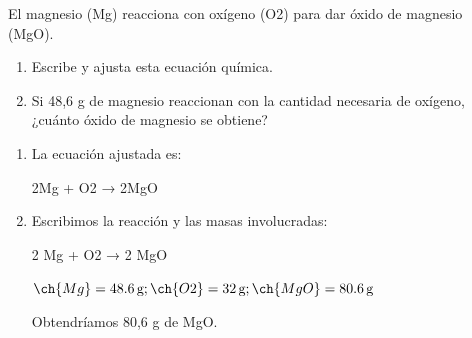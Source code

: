 \begin{exercise}
    El magnesio (Mg) reacciona con oxígeno (O2) para dar óxido de magnesio (MgO).
    \begin{enumerate}[label=\letraminuscula]
        \item Escribe y ajusta esta ecuación química.
        \item Si 48,6 g de magnesio reaccionan con la
        cantidad necesaria de oxígeno, ¿cuánto
        óxido de magnesio se obtiene?
    \end{enumerate}
    \begin{solu}
        \begin{enumerate}[label=\letraminuscula]
            \item La ecuación ajustada es:
            \begin{reaction*}
                2Mg + O2 → 2MgO
            \end{reaction*}
            \item Escribimos la reacción y las masas involucradas:
            \begin{reaction*}
                2 Mg + O2 → 2 MgO
            \end{reaction*}
            \( \ch{Mg} = \qty{48.6}{\g}; \ch{O2} = \qty{32}{\g}; \ch{MgO} = \qty{80.6}{\g} \)

            Obtendríamos 80,6 g de MgO.
        \end{enumerate}
    \end{solu}
\end{exercise}


